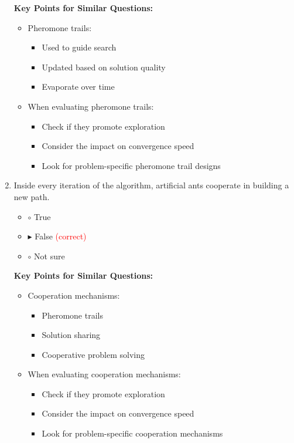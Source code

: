 \begin{enumerate}[label=\alph*)]
\textbf{Key Points for Similar Questions:}
\begin{itemize}
\item Pheromone trails:
  \begin{itemize}
  \item Used to guide search
  \item Updated based on solution quality
  \item Evaporate over time
  \end{itemize}
\item When evaluating pheromone trails:
  \begin{itemize}
  \item Check if they promote exploration
  \item Consider the impact on convergence speed
  \item Look for problem-specific pheromone trail designs
  \end{itemize}
\end{itemize}

\item Inside every iteration of the algorithm, artificial ants cooperate in building a new path.
\begin{itemize}
\item $\circ$ True
\item $\blacktriangleright$ False \hspace{1em} \textcolor{red}{(correct)}
\item $\circ$ Not sure
\end{itemize}

\textbf{Key Points for Similar Questions:}
\begin{itemize}
\item Cooperation mechanisms:
  \begin{itemize}
  \item Pheromone trails
  \item Solution sharing
  \item Cooperative problem solving
  \end{itemize}
\item When evaluating cooperation mechanisms:
  \begin{itemize}
  \item Check if they promote exploration
  \item Consider the impact on convergence speed
  \item Look for problem-specific cooperation mechanisms
  \end{itemize}
\end{itemize}


\end{enumerate}
